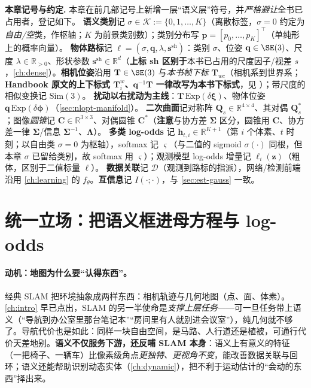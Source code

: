 \begin{note}
\textbf{本章记号与约定.}\;
本章在前几部记号上新增一层“语义层”符号，并\emph{严格避让}全书已占用者，登记如下。
\textbf{语义类别}记 $\sigma\in\mathcal{K}:=\{0,1,\dots,K\}$（离散标签，$\sigma{=}0$ 约定为\emph{自由/空}类，作枢轴；$K$ 为前景类别数）；类别分布写 $\mathbf{p}=[p_0,\dots,p_K]^\top$（单纯形上的概率向量）。
\textbf{物体路标}记 $\boldsymbol\ell=(\sigma,\mathbf{q},\lambda,\mathbf{s}^{\mathrm{sh}})$：类别 $\sigma$、位姿 $\mathbf{q}\in\SE(3)$、尺度 $\lambda\in\mathbb{R}_{>0}$、形状参数 $\mathbf{s}^{\mathrm{sh}}\in\mathbb{R}^{d}$（\textbf{上标 sh 区别于}本书已占用的尺度因子/视差 $s$，\cref{ch:dense}）。\textbf{相机位姿}沿用 $\mathbf{T}\in\SE(3)$ 与\emph{本书帧下标} $\mathbf{T}_{wc}$（相机系到世界系；\textbf{Handbook 原文的上下标式 $\mathbf{T}_i^w$、$\mathbf{q}^{-1}\mathbf{T}$ 一律改写为本书下标式}，见 ）；带尺度的相似变换记 $\mathrm{Sim}(3)$。
\textbf{扰动以右扰动为主线}：$\mathbf{T}\,\mathrm{Exp}(\delta\boldsymbol\xi)$、物体位姿 $\mathbf{q}\,\mathrm{Exp}(\delta\boldsymbol\phi)$（\cref{sec:nlopt-manifold}）。
\textbf{二次曲面}记对称阵 $\mathbf{Q}_s\in\mathbb{R}^{4\times4}$、其对偶 $\mathbf{Q}_s^{*}$；图像\emph{圆锥}记 $\mathbf{C}\in\mathbb{R}^{3\times3}$、对偶圆锥 $\mathbf{C}^{*}$（\textbf{注意}与协方差 $\boldsymbol\Sigma$ 区分，圆锥用 $\mathbf{C}$、协方差一律 $\boldsymbol\Sigma$/信息 $\boldsymbol\Sigma^{-1}$、$\boldsymbol\Lambda$）。
\textbf{多类 log-odds} 记 $\mathbf{h}_{t,i}\in\mathbb{R}^{K+1}$（第 $i$ 个体素、$t$ 时刻；以自由类 $\sigma{=}0$ 为枢轴），softmax 记 $\boldsymbol\varsigma$（与二值的 sigmoid $\sigma(\cdot)$ 同根，但本章 $\sigma$ 已留给类别，故 softmax 用 $\boldsymbol\varsigma$）；观测模型 log-odds 增量记 $\boldsymbol\ell_i(\mathbf{z})$（粗体，区别于二值标量 $\ell$）。
\textbf{数据关联}记 $\mathcal{D}$（观测到路标的指派），网络/检测前端沿用 \cref{ch:learning} 的 $f_\theta$。\textbf{互信息}记 $I(\cdot;\cdot)$，与 \cref{sec:est-gauss} 一致。
\end{note}

\section{统一立场：把语义框进母方程与 log-odds}
\label{sec:semantic-frame}

\paragraph{动机：地图为什么要“认得东西”。}
经典 SLAM 把环境抽象成两样东西：相机轨迹与几何地图（点、面、体素）。\cref{ch:intro} 早已点出，SLAM 的另一半使命是\emph{支撑上层任务}——可一旦任务带上语义（“导航到办公室里那台笔记本”“房间里有人就别进会议室”），纯几何就不够了\cite{carlone2026handbook}。导航代价也是如此：同样一块自由空间，是马路、人行道还是植被，可通行代价天差地别\cite{maturana2018semantic}。\textbf{语义不仅服务下游，还反哺 SLAM 本身}：语义上有意义的特征（一把椅子、一辆车）比像素级角点\emph{更独特、更视角不变}，能改善数据关联与回环\cite{bowman2017probabilistic,civera2011towards}；语义还能帮助识别动态实体（\cref{ch:dynamic}），把不利于运动估计的“会动的东西”择出来\cite{rosinol2021kimera}。

